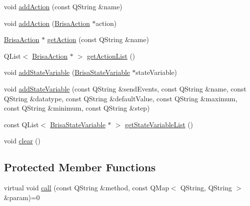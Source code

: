 \begin{DoxyCompactItemize}
\item 
void \hyperlink{classBrisaUpnp_1_1BrisaAbstractService_a628800df3aed5b953316bb8e55257ea5}{addAction} (const QString \&name)
\item 
void \hyperlink{classBrisaUpnp_1_1BrisaAbstractService_ae4281e7bd63534372762f662c8a923d6}{addAction} (\hyperlink{classBrisaUpnp_1_1BrisaAction}{BrisaAction} $\ast$action)
\item 
\hyperlink{classBrisaUpnp_1_1BrisaAction}{BrisaAction} $\ast$ \hyperlink{classBrisaUpnp_1_1BrisaAbstractService_a25e82678349b2a96b59c83b205a1b965}{getAction} (const QString \&name)
\item 
QList$<$ \hyperlink{classBrisaUpnp_1_1BrisaAction}{BrisaAction} $\ast$ $>$ \hyperlink{classBrisaUpnp_1_1BrisaAbstractService_a44420fad863b160c83ab07d87c2f87e5}{getActionList} ()
\item 
void \hyperlink{classBrisaUpnp_1_1BrisaAbstractService_aa60cf051ff332d06991c9e394f75b372}{addStateVariable} (\hyperlink{classBrisaUpnp_1_1BrisaStateVariable}{BrisaStateVariable} $\ast$stateVariable)
\item 
void \hyperlink{classBrisaUpnp_1_1BrisaAbstractService_a6a43f76000d4e9a35f38cfa1b6505bd0}{addStateVariable} (const QString \&sendEvents, const QString \&name, const QString \&datatype, const QString \&defaultValue, const QString \&maximum, const QString \&minimum, const QString \&step)
\item 
const QList$<$ \hyperlink{classBrisaUpnp_1_1BrisaStateVariable}{BrisaStateVariable} $\ast$ $>$ \hyperlink{classBrisaUpnp_1_1BrisaAbstractService_ac410ff9af341b30ed287e81418a9776b}{getStateVariableList} ()
\item 
void \hyperlink{classBrisaUpnp_1_1BrisaAbstractService_ab71b54a010710a00eac20e3ff0f4b216}{clear} ()
\end{DoxyCompactItemize}
\subsection*{Protected Member Functions}
\begin{DoxyCompactItemize}
\item 
virtual void \hyperlink{classBrisaUpnp_1_1BrisaAbstractService_ade3461839c097933b60f5b8d8fba7290}{call} (const QString \&method, const QMap$<$ QString, QString $>$ \&param)=0
\end{DoxyCompactItemize}
